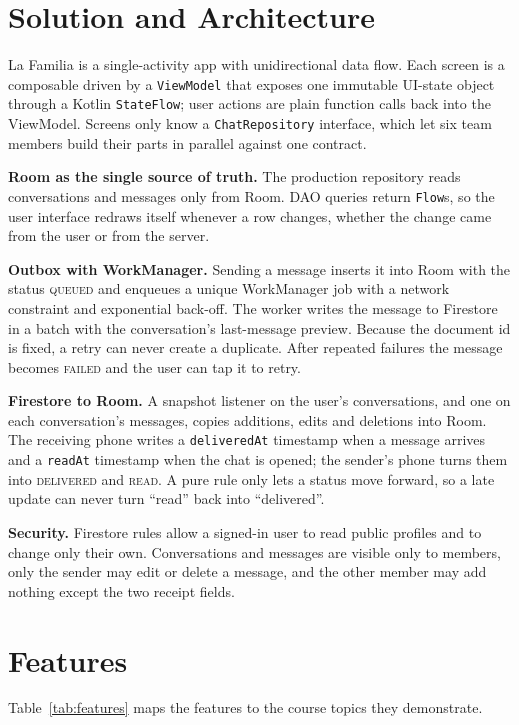 \documentclass[sigconf,nonacm]{acmart}
\begin{document}
\section{Solution and Architecture}
La Familia is a single-activity app with unidirectional data flow. Each screen is a
composable driven by a \texttt{ViewModel} that exposes one immutable UI-state object
through a Kotlin \texttt{StateFlow}; user actions are plain function calls back into the
ViewModel. Screens only know a \texttt{ChatRepository} interface, which let six team
members build their parts in parallel against one contract.

\textbf{Room as the single source of truth.} The production repository reads
conversations and messages only from Room. DAO queries return \texttt{Flow}s, so the
user interface redraws itself whenever a row changes, whether the change came from the
user or from the server.

\textbf{Outbox with WorkManager.} Sending a message inserts it into Room with the status
\textsc{queued} and enqueues a unique WorkManager job with a network constraint and
exponential back-off. The worker writes the message to Firestore in a batch with the
conversation's last-message preview. Because the document id is fixed, a retry can never
create a duplicate. After repeated failures the message becomes \textsc{failed} and the
user can tap it to retry.

\textbf{Firestore to Room.} A snapshot listener on the user's conversations, and one on
each conversation's messages, copies additions, edits and deletions into Room. The
receiving phone writes a \texttt{deliveredAt} timestamp when a message arrives and a
\texttt{readAt} timestamp when the chat is opened; the sender's phone turns them into
\textsc{delivered} and \textsc{read}. A pure rule only lets a status move forward, so a
late update can never turn ``read'' back into ``delivered''.

\textbf{Security.} Firestore rules allow a signed-in user to read public profiles and to
change only their own. Conversations and messages are visible only to members, only the
sender may edit or delete a message, and the other member may add nothing except the two
receipt fields.

\section{Features}
Table~\ref{tab:features} maps the features to the course topics they demonstrate.
\end{document}
